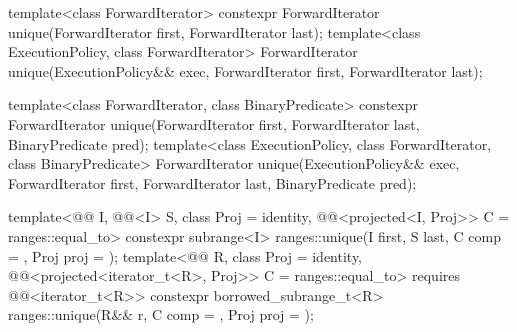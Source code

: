 %
\begin{itemdecl}
template<class ForwardIterator>
  constexpr ForwardIterator unique(ForwardIterator first, ForwardIterator last);
template<class ExecutionPolicy, class ForwardIterator>
  ForwardIterator unique(ExecutionPolicy&& exec,
                         ForwardIterator first, ForwardIterator last);

template<class ForwardIterator, class BinaryPredicate>
  constexpr ForwardIterator unique(ForwardIterator first, ForwardIterator last,
                                   BinaryPredicate pred);
template<class ExecutionPolicy, class ForwardIterator, class BinaryPredicate>
  ForwardIterator unique(ExecutionPolicy&& exec,
                         ForwardIterator first, ForwardIterator last,
                         BinaryPredicate pred);

template<@@ I, @@<I> S, class Proj = identity,
         @@<projected<I, Proj>> C = ranges::equal_to>
  constexpr subrange<I> ranges::unique(I first, S last, C comp = {}, Proj proj = {});
template<@@ R, class Proj = identity,
         @@<projected<iterator_t<R>, Proj>> C = ranges::equal_to>
  requires @@<iterator_t<R>>
  constexpr borrowed_subrange_t<R>
    ranges::unique(R&& r, C comp = {}, Proj proj = {});
\end{itemdecl}

